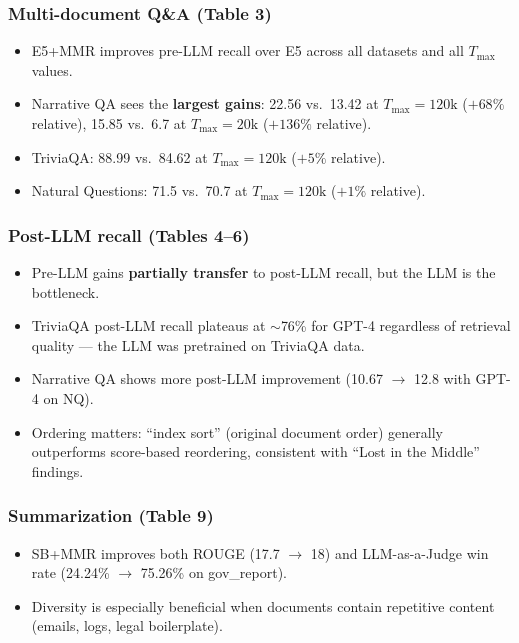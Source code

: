 \documentclass[11pt,a4paper]{article}
\begin{document}
\subsubsection{Multi-document Q\&A (Table 3)}

\begin{itemize}[leftmargin=*]
	\item E5+MMR improves pre-LLM recall over E5 across all datasets and all $T_{\max}$ values.
	\item Narrative QA sees the \textbf{largest gains}: 22.56 vs.\ 13.42 at $T_{\max} = 120\text{k}$ ($+68\%$ relative), 15.85 vs.\ 6.7 at $T_{\max} = 20\text{k}$ ($+136\%$ relative).
	\item TriviaQA: 88.99 vs.\ 84.62 at $T_{\max} = 120\text{k}$ ($+5\%$ relative).
	\item Natural Questions: 71.5 vs.\ 70.7 at $T_{\max} = 120\text{k}$ ($+1\%$ relative).
\end{itemize}

\subsubsection{Post-LLM recall (Tables 4--6)}

\begin{itemize}[leftmargin=*]
	\item Pre-LLM gains \textbf{partially transfer} to post-LLM recall, but the LLM is the bottleneck.
	\item TriviaQA post-LLM recall plateaus at $\sim$76\% for GPT-4 regardless of retrieval quality --- the LLM was pretrained on TriviaQA data.
	\item Narrative QA shows more post-LLM improvement (10.67 $\to$ 12.8 with GPT-4 on NQ).
	\item Ordering matters: ``index sort'' (original document order) generally outperforms score-based reordering, consistent with ``Lost in the Middle'' findings.
\end{itemize}

\subsubsection{Summarization (Table 9)}

\begin{itemize}[leftmargin=*]
	\item SB+MMR improves both ROUGE (17.7 $\to$ 18) and LLM-as-a-Judge win rate (24.24\% $\to$ 75.26\% on gov\_report).
	\item Diversity is especially beneficial when documents contain repetitive content (emails, logs, legal boilerplate).
\end{itemize}
\end{document}
